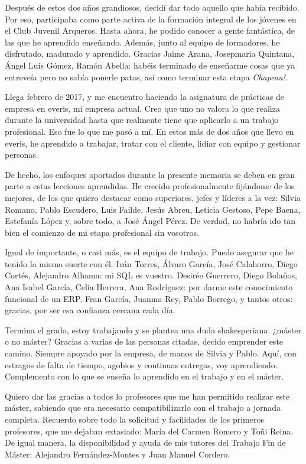 Después de estos dos años grandiosos, decidí dar todo aquello que había recibido. Por eso, participaba como parte activa de la formación integral de los jóvenes en el Club Juvenil Arqueros. Hasta ahora, he podido conocer a gente fantástica, de las que he aprendido enseñando. Además, junto al equipo de formadores, he disfrutado, madurado y aprendido. Gracias Jaime Arana, Josepmaria Quintana, Ángel Luis Gómez, Ramón Abella: habéis terminado de enseñarme cosas que ya entreveía pero no sabía ponerle patas, así como terminar esta etapa \textit{Chapeau!}.

Llega febrero de 2017, y me encuentro haciendo la asignatura de prácticas de empresa en everis, mi empresa actual. Creo que uno no valora lo que realiza durante la universidad hasta que realmente tiene que aplicarlo a un trabajo profesional. Eso fue lo que me pasó a mí. En estos más de dos años que llevo en everis, he aprendido a trabajar, tratar con el cliente, lidiar con equipo y gestionar personas.

De hecho, los enfoques aportados durante la presente memoria se deben en gran parte a estas lecciones aprendidas. He crecido profesionalmente fijándome de los mejores, de los que quiero destacar como superiores, jefes y líderes a la vez: Silvia Romano, Pablo Escudero, Luis Failde, Jesús Abreu, Leticia Gestoso, Pepe Baena, Estefanía López y, sobre todo, a José Ángel Pérez. De verdad, no habría ido tan bien el comienzo de mi etapa profesional sin vosotros.

Igual de importante, o casi más, es el equipo de trabajo. Puedo asegurar que he tenido la misma suerte con él. Iván Torres, Álvaro García, José Calahorro, Diego Cortés, Alejandro Alhama: mi SQL es vuestro. Desirée Guerrero, Diego Bolaños, Ana Isabel García, Celia Herrera, Ana Rodríguez: por darme este conocimiento funcional de un ERP. Fran García, Juanma Rey, Pablo Borrego, y tantos otros: gracias, por ser esa confianza cercana cada día.

Termina el grado, estoy trabajando y se plantea una duda shakesperiana: ¿máster o no máster? Gracias a varias de las personas citadas, decido emprender este camino. Siempre apoyado por la empresa, de manos de Silvia y Pablo. Aquí, con estragos de falta de tiempo, agobios y continuas entregas, voy aprendiendo. Complemento con lo que se enseña lo aprendido en el trabajo y en el máster.

Quiero dar las gracias a todos lo profesores que me han permitido realizar este máster, sabiendo que era necesario compatibilizarlo con el trabajo a jornada completa. Recuerdo sobre todo la solicitud y facilidades de los primeros profesores, que me dejaban extasiado: María del Carmen Romero y Toñi Reina. De igual manera, la disponibilidad y ayuda de mis tutores del Trabajo Fin de Máster: Alejandro Fernández-Montes y Juan Manuel Cordero.

